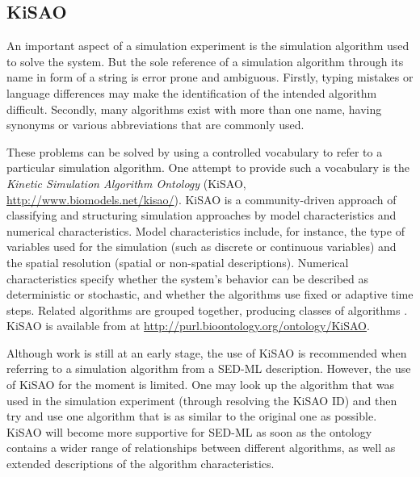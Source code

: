 \subsection{KiSAO}
\label{sec:kisao}

An important aspect of a simulation experiment is the simulation algorithm used to solve the system.
But the sole reference of a simulation algorithm through its name in form of a string is error prone and ambiguous. Firstly, typing mistakes or language differences may make the identification of the intended algorithm difficult. Secondly, many algorithms exist with more than one name, having synonyms or various abbreviations that are commonly used.

These problems can be solved by using a controlled vocabulary to refer to a particular simulation algorithm. One attempt to provide such a vocabulary is the \emph{Kinetic Simulation Algorithm Ontology} (KiSAO, \url{http://www.biomodels.net/kisao/}). KiSAO is a community-driven approach of classifying and structuring simulation approaches by model characteristics and numerical characteristics.  Model characteristics include, for instance, the type of variables used for the simulation (such as discrete or continuous variables) and the spatial resolution (spatial or non-spatial descriptions). Numerical characteristics specify whether the system's behavior can be described as deterministic or stochastic, and whether the algorithms use fixed or adaptive time steps.  
Related algorithms are grouped together, producing classes of algorithms \citep{CWK+10}.
KiSAO is available from  at \url{http://purl.bioontology.org/ontology/KiSAO}.
%
%

Although work is still at an early stage, the use of KiSAO is recommended when referring to a simulation algorithm from a SED-ML description. However, the use of KiSAO for the moment is limited. One may look up the algorithm that was used in the simulation experiment (through resolving the KiSAO ID) and then try and use one algorithm that is as similar to the original one as possible. KiSAO will become more supportive for SED-ML as soon as the ontology contains a wider range of relationships between different algorithms, as well as extended descriptions of the algorithm characteristics.


